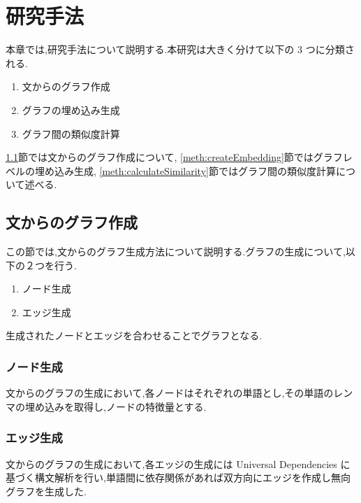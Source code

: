 \documentclass[a4j,twoside,12pt]{thesis} %
\begin{document}
\addtocounter{chapter}{+2}

\setlength{\baselineskip}{1.95zw}
\setlength{\textheight}{30\baselineskip}
\mainmatter

\fi
%
\renewcommand\thefootnote{\arabic{footnote})}
\def\vector#1{\mbox{\boldmath $#1$}}

\chapter{研究手法}\label{meth}
本章では,研究手法について説明する.本研究は大きく分けて以下の 3 つに分類される.
\begin{enumerate}
  \item 文からのグラフ作成
  \item グラフの埋め込み生成
  \item グラフ間の類似度計算
\end{enumerate}
\ref{meth:createGraph}節では文からのグラフ作成について, \ref{meth:createEmbedding}節ではグラフレベルの埋め込み生成, \ref{meth:calculateSimilarity}節ではグラフ間の類似度計算について述べる.

\section{文からのグラフ作成}\label{meth:createGraph}
  この節では,文からのグラフ生成方法について説明する.グラフの生成について,以下の２つを行う.
  \begin{enumerate}
    \item ノード生成
    \item エッジ生成
  \end{enumerate}
  生成されたノードとエッジを合わせることでグラフとなる.

  \subsection{ノード生成}\label{meth:createNode}
    文からのグラフの生成において,各ノードはそれぞれの単語とし,その単語のレンマの埋め込みを取得し,ノードの特徴量とする.

  \subsection{エッジ生成}\label{meth:createEdge}
    文からのグラフの生成において,各エッジの生成には Universal Dependencies に基づく構文解析を行い,単語間に依存関係があれば双方向にエッジを作成し無向グラフを生成した.
\end{document}

